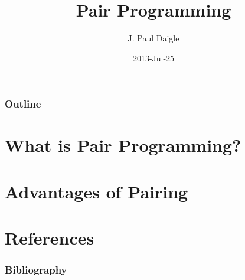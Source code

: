 

\title[] %
{Pair Programming}

\subtitle
{} %

\author[] %
{J. Paul Daigle }



\date[] %
{2013-Jul-25}

\subject{}














\begin{frame}
  \titlepage
\end{frame}

\begin{frame}
  \frametitle{Outline}
  \tableofcontents
\end{frame}


\section{What is Pair Programming?}

\section{Advantages of Pairing}


\section{References}
\begin{frame}[allowframebreaks]
  \frametitle{Bibliography}
  
\end{frame}



